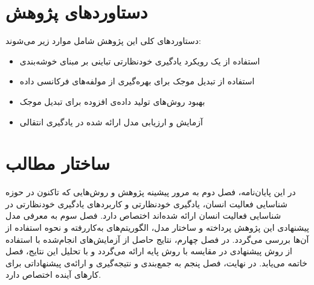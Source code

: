 \section{دستاوردهای پژوهش}

دستاوردهای کلی این پژوهش شامل موارد زیر می‌شوند:

\begin{itemize}
\item{استفاده از یک رویکرد یادگیری خودنظارتی تباینی بر مبنای خوشه‌بندی}
\item{استفاده از تبدیل موجک برای بهره‌گیری از مولفه‌های فرکانسی داده}
\item{بهبود روش‌های تولید داده‌ی افزوده برای تبدیل موجک}
\item{آزمایش و ارزیابی مدل ارائه شده در یادگیری انتقالی}
\end{itemize}

\section{ساختار مطالب}
در این پایان‌نامه،‌ فصل دوم به مرور پیشینه پژوهش و روش‌هایی که تاکنون در حوزه شناسایی فعالیت انسان، یادگیری خودنظارتی و کاربردهای یادگیری خودنظارتی در شناسایی فعالیت انسان ارائه شده‌اند اختصاص دارد. فصل سوم به معرفی مدل پیشنهادی این پژوهش پرداخته و ساختار مدل، الگوریتم‌های به‌کاررفته و نحوه استفاده از آن‌ها بررسی می‌گردد. در فصل چهارم، نتایج حاصل از آزمایش‌های انجام‌شده با استفاده از روش پیشنهادی در مقایسه با روش پایه ارائه می‌گردد و با تحلیل این نتایج، فصل خاتمه می‌یابد. در نهایت،‌ فصل پنجم به جمع‌بندی و نتیجه‌گیری و ارائه‌ی پیشنهاداتی برای کارهای آینده اختصاص دارد.
